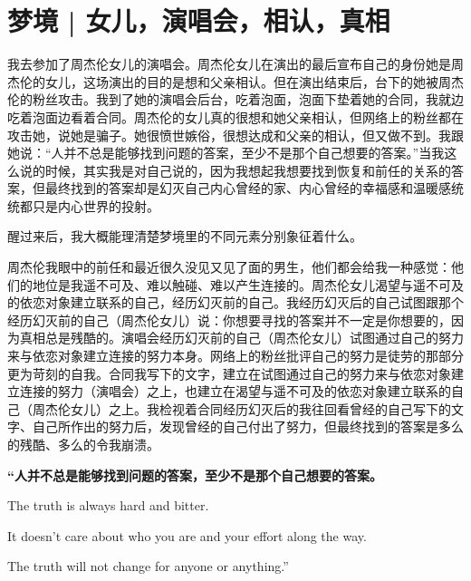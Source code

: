 \chapter{梦境 | 女儿，演唱会，相认，真相}




我去参加了周杰伦女儿的演唱会。周杰伦女儿在演出的最后宣布自己的身份\pozhehao{}她是周杰伦的女儿，这场演出的目的是想和父亲相认。但在演出结束后，台下的她被周杰伦的粉丝攻击。我到了她的演唱会后台，吃着泡面，泡面下垫着她的合同，我就边吃着泡面边看着合同。周杰伦的女儿真的很想和她父亲相认，但网络上的粉丝都在攻击她，说她是骗子。她很愤世嫉俗，很想达成和父亲的相认，但又做不到。我跟她说：“人并不总是能够找到问题的答案，至少不是那个自己想要的答案。”当我这么说的时候，其实我是对自己说的，因为我想起我想要找到恢复和前任的关系的答案，但最终找到的答案却是幻灭\pozhehao{}自己内心曾经的家、内心曾经的幸福感和温暖感统统都只是内心世界的投射。

醒过来后，我大概能理清楚梦境里的不同元素分别象征着什么。

周杰伦\pozhehao{}我眼中的前任和最近很久没见又见了面的男生，他们都会给我一种感觉：他们的地位是我遥不可及、难以触碰、难以产生连接的。周杰伦女儿\pozhehao{}渴望与遥不可及的依恋对象建立联系的自己，经历幻灭前的自己。我\pozhehao{}经历幻灭后的自己试图跟那个经历幻灭前的自己（周杰伦女儿）说：你想要寻找的答案并不一定是你想要的，因为真相总是残酷的。演唱会\pozhehao{}经历幻灭前的自己（周杰伦女儿）试图通过自己的努力来与依恋对象建立连接的努力本身。网络上的粉丝\pozhehao{}批评自己的努力是徒劳的那部分更为苛刻的自我。合同\pozhehao{}我写下的文字，建立在试图通过自己的努力来与依恋对象建立连接的努力（演唱会）之上，也建立在渴望与遥不可及的依恋对象建立联系的自己（周杰伦女儿）之上。我检视着合同\pozhehao{}经历幻灭后的我往回看曾经的自己写下的文字、自己所作出的努力后，发现曾经的自己付出了努力，但最终找到的答案是多么的残酷、多么的令我崩溃。

\noindent\begin{minipage}{\linewidth}
    \center\bfseries
    “人并不总是能够找到问题的答案，至少不是那个自己想要的答案。
    
    The truth is always hard and bitter.
    
    It doesn't care about who you are and your effort along the way.
    
    The truth will not change for anyone or anything.”
\end{minipage}


